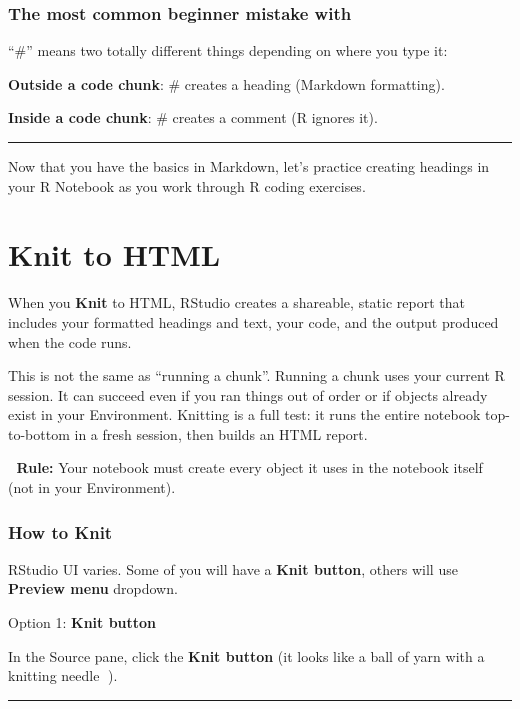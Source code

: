 \documentclass[
  12pt,
]{scrreprt}
\begin{document}
\subsection{The most common beginner mistake
with}\label{the-most-common-beginner-mistake-with}

``\#'' means two totally different things depending on where you type
it:

\textbf{Outside a code chunk}: \# creates a heading (Markdown
formatting).

\textbf{Inside a code chunk}: \# creates a comment (R ignores it).

\begin{center}\rule{0.5\linewidth}{0.5pt}\end{center}

Now that you have the basics in Markdown, let's practice creating
headings in your R Notebook as you work through R coding exercises.

\chapter{Knit to HTML}\label{knit-to-html}

When you \textbf{Knit} to HTML, RStudio creates a shareable, static
report that includes your formatted headings and text, your code, and
the output produced when the code runs.

This is not the same as ``running a chunk''. Running a chunk uses your
current R session. It can succeed even if you ran things out of order or
if objects already exist in your Environment. Knitting is a full test:
it runs the entire notebook top-to-bottom in a fresh session, then
builds an HTML report.

📏 \textbf{Rule:} Your notebook must create every object it uses in the
notebook itself (not in your Environment).

\subsection{How to Knit}\label{how-to-knit}

RStudio UI varies. Some of you will have a \textbf{Knit button}, others
will use \textbf{Preview menu} dropdown.

Option 1: \textbf{Knit button}

In the Source pane, click the \textbf{Knit button} (it looks like a ball
of yarn with a knitting needle 🧶).

\begin{center}\rule{0.5\linewidth}{0.5pt}\end{center}
\end{document}
